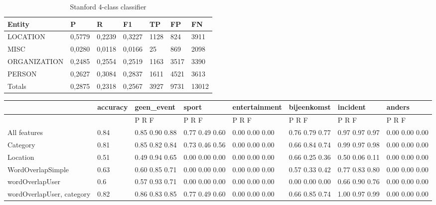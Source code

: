 \documentclass[
10pt, %
a4paper, %
oneside, %
headinclude,footinclude, %
BCOR5mm, %
]{scrartcl}
\begin{document}
\begin{table}[h]
\begin{tabular}{|l|l|l|l|l|l|l|}
\hline
Entity       & P      & R      & F1     & TP   & FP   & FN    \\ \hline
LOCATION     & 0,5779 & 0,2239 & 0,3227 & 1128 & 824  & 3911  \\ \hline
MISC         & 0,0280 & 0,0118 & 0,0166 & 25   & 869  & 2098  \\ \hline
ORGANIZATION & 0,2485 & 0,2554 & 0,2519 & 1163 & 3517 & 3390  \\ \hline
PERSON       & 0,2627 & 0,3084 & 0,2837 & 1611 & 4521 & 3613  \\ \hline
Totals       & 0,2875 & 0,2318 & 0,2567 & 3927 & 9731 & 13012 \\ \hline
\end{tabular}
\caption[Table caption text]{Stanford 4-class classifier }
\end{table}



\begin{landscape}
\begin{table}[h]
\begin{tabular}{|l|l|l|l|l|l|l|l|}
\hline
                          & accuracy & geen\_event    & sport          & entertainment  & bijeenkomst    & incident       & anders         \\ \hline
                          &          & P    R    F    & P    R    F    & P    R    F    & P    R    F    & P    R    F    & P    R    F    \\ \hline
All features              & 0.84     & 0.85 0.90 0.88 & 0.77 0.49 0.60 & 0.00 0.00 0.00 & 0.76 0.79 0.77 & 0.97 0.97 0.97 & 0.00 0.00 0.00 \\ \hline
Category                  & 0.81     & 0.85 0.82 0.84 & 0.73 0.46 0.56 & 0.00 0.00 0.00 & 0.66 0.84 0.74 & 0.99 0.97 0.98 & 0.00 0.00 0.00 \\ \hline
Location                  & 0.51     & 0.49 0.94 0.65 & 0.00 0.00 0.00 & 0.00 0.00 0.00 & 0.66 0.25 0.36 & 0.50 0.06 0.11 & 0.00 0.00 0.00 \\ \hline
WordOverlapSimple         & 0.63     & 0.60 0.85 0.71 & 0.00 0.00 0.00 & 0.00 0.00 0.00 & 0.57 0.33 0.42 & 0.77 0.83 0.80 & 0.00 0.00 0.00 \\ \hline
wordOverlapUser           & 0.6      & 0.57 0.93 0.71 & 0.00 0.00 0.00 & 0.00 0.00 0.00 & 0.00 0.00 0.00 & 0.66 0.90 0.76 & 0.00 0.00 0.00 \\ \hline
wordOverlapUser, category & 0.82     & 0.86 0.83 0.85 & 0.77 0.49 0.60 & 0.00 0.00 0.00 & 0.66 0.85 0.74 & 1.00 0.97 0.99 & 0.00 0.00 0.00 \\ \hline
\end{tabular}
\end{table}
\end{landscape}


\end{document}

